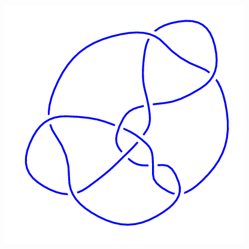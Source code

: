 \begin{figure}[H]
\begin{minipage}[b]{.18\linewidth}
	\end{minipage}
	\begin{minipage}[b]{.18\linewidth}
		\centering
		\includegraphics[width=\linewidth]{../data/10_156.png}
	\end{minipage}
\end{figure}
